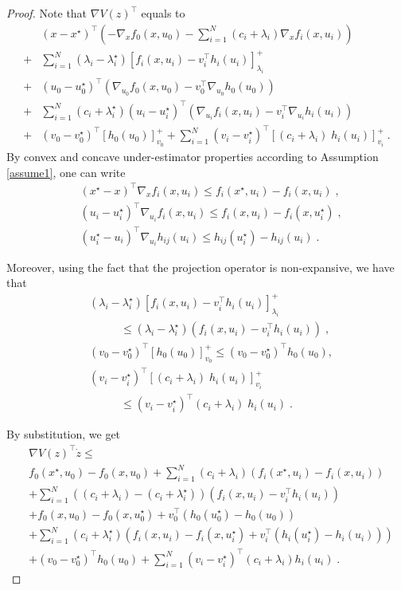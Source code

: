 \documentclass[journal,twoside,web]{ieeecolor}
\begin{document}
\begin{proof}
Note that $\nabla V(z)^\top$ equals to
\begin{align}
&(x-x^\star)^\top(-\nabla_x f_0(x,u_0)-  \sum_{i=1}^N(c_i+\lambda_i) \nabla_x f_i(x,u_i))\nonumber\\
+&\sum_{i=1}^N(\lambda_i-\lambda_{i}^\star) [f_i(x,u_i)-v_i^\top h_i(u_i)]_{\lambda_i}^+\nonumber\\
+&(u_0-u_0^\star)^\top (\nabla_{u_0} f_0(x,u_0)-v_{0}^\top \nabla_{u_0} h_{0}(u_0))\nonumber\\
+&\sum_{i=1}^N(c_i+\lambda_{i}^\star)(u_i-u_{i}^\star)^\top (\nabla_{u_i} f_i(x,u_i)-v_{i}^\top \nabla_{u_i} h_{i}(u_i))\nonumber\\
+& (v_0-v_0^\star)^\top [h_0(u_0)]_{v_0}^++ \sum_{i=1}^N (v_{i}-v_{{i}}^\star)^\top [(c_i+\lambda_i)\; h_{i}(u_i)]_{v_{i}}^+\;.
\end{align}
By convex and concave under-estimator properties according to Assumption \ref{assume1}, one can write \cite[Section~3.1.3]{boyd2004}
\begin{align}
&(x^\star-x)^\top \nabla_x f_i(x,u_i) \leq f_i(x^\star,u_i)-f_i(x,u_i)\;,\label{under_estimator_2}\\
&(u_i-u_i^\star)^\top \nabla_{u_i} f_i(x,u_i) \leq f_i(x,u_i)-f_i(x,u_i^\star)\;,\label{under_estimator_3}\\
&(u_i^\star-u_i)^\top \nabla_{u_i} h_{ij}(u_i) \leq h_{ij}(u_i^\star)-h_{ij}(u_i)\;.\label{under_estimator_4}
\end{align}

Moreover, using the fact that the projection operator is non-expansive, we have that
\begin{align}
&(\lambda_i-\lambda_{i}^\star) [f_i(x,u_i)-v_i^\top h_i(u_i)]_{\lambda_i}^+\nonumber\\
&\;\;\;\;\;\;\;\;\;\;\leq(\lambda_i-\lambda_{i}^\star) (f_i(x,u_i)-v_i^\top h_i(u_i))\;,\\
&(v_{0}-v_{{0}}^\star)^\top [ h_{0}(u_0)]_{v_{0}}^+
\leq(v_0-v_{{0}}^\star)^\top h_{0}(u_0),\\
&(v_{i}-v_{{i}}^\star)^\top [(c_i+\lambda_i)\; h_{i}(u_i)]_{v_{i}}^+\nonumber\\
&\;\;\;\;\;\;\;\;\;\;\leq(v_{i}-v_{{i}}^\star)^\top (c_i+\lambda_i)\; h_{i}(u_i)\;.
\end{align}

By substitution, we get
\begin{align}
&\nabla V(z)^\top \dot z \leq\nonumber\\ &f_0(x^\star,u_0)-f_0(x,u_0)+  \sum_{i=1}^N(c_i+\lambda_i) (f_i(x^\star,u_i)-f_i(x,u_i))\nonumber\\
&+ \sum_{i=1}^N((c_i+\lambda_i)-(c_i+\lambda_i^\star))(f_i(x,u_i)-v_i^\top h_i(u_i))\nonumber\\
&+f_0(x,u_0)-f_0(x,u_0^\star)+v_0^\top (h_0(u_0^\star)-h_0(u_0))\nonumber\\
&+ \sum_{i=1}^N (c_i+\lambda_i^\star) (f_i(x,u_i)-f_i(x,u_i^\star)+v_i^\top (h_i(u_i^\star)-h_i(u_i)))\nonumber\\
&+(v_0-v_0^\star)^\top h_0(u_0)+  \sum_{i=1}^N (v_{i}-v_{i}^\star)^\top(c_i+\lambda_i) h_{i}(u_i)\;. \label{vdot_first}
\end{align}


\end{proof}
\end{document}
